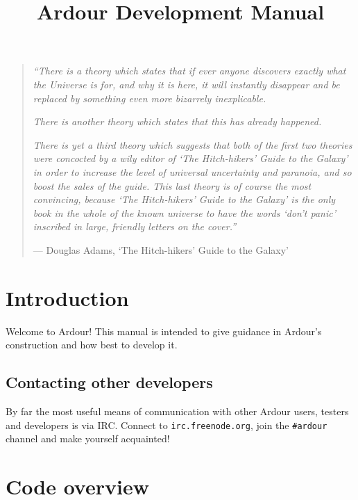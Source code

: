\documentclass[10pt,a4paper]{book}
\title{Ardour Development Manual}
\author{}
\begin{document}
\maketitle

\clearpage
\thispagestyle{empty}

\bigskip
\bigskip
\bigskip

\begin{quote}

\emph{``There is a theory which states that if ever anyone discovers
  exactly what the Universe is for, and why it is here, it will
  instantly disappear and be replaced by something even more bizarrely
  inexplicable.}

\smallskip

\emph{There is another theory which states that this has
  already happened.}

\smallskip

\emph{There is yet a third theory which suggests that
  both of the first two theories were concocted by a wily editor of
  `The Hitch-hikers' Guide to the Galaxy' in order to increase the
  level of universal uncertainty and paranoia, and so boost the sales
  of the guide.  This last theory is of course the most convincing,
  because `The Hitch-hikers' Guide to the Galaxy' is the only book in
  the whole of the known universe to have the words `don't panic'
  inscribed in large, friendly letters on the cover.''}

\smallskip

--- Douglas Adams, `The Hitch-hikers' Guide to the Galaxy'
\end{quote}

\chapter{Introduction}

Welcome to Ardour!  This manual is intended to give guidance in
Ardour's construction and how best to develop it.

\section{Contacting other developers}

By far the most useful means of communication with other Ardour users,
testers and developers is via IRC.  Connect to
\texttt{irc.freenode.org}, join the \texttt{\#ardour} channel and make
yourself acquainted!

\chapter{Code overview}
\end{document}
